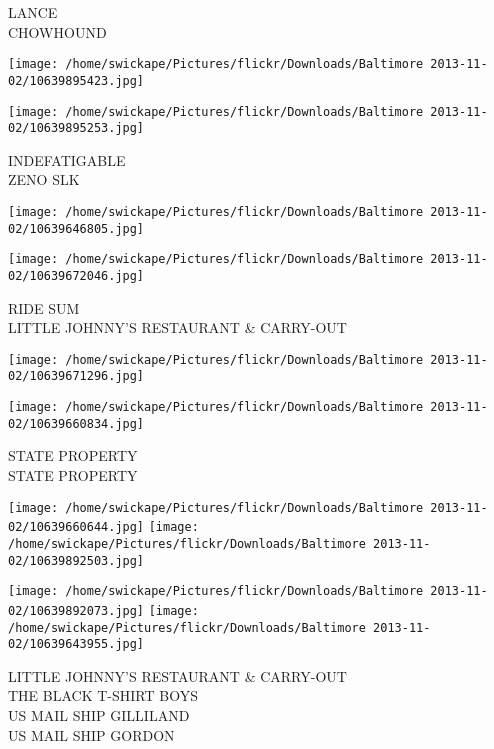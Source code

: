 \documentclass[10pt,letterpaper]{article}
\begin{document}
LANCE\\
CHOWHOUND\\
\pagebreak

\texttt{[image: /home/swickape/Pictures/flickr/Downloads/Baltimore 2013-11-02/10639895423.jpg]}

\vspace{0.25in}
\texttt{[image: /home/swickape/Pictures/flickr/Downloads/Baltimore 2013-11-02/10639895253.jpg]}

INDEFATIGABLE\\
ZENO SLK\\
\pagebreak

\texttt{[image: /home/swickape/Pictures/flickr/Downloads/Baltimore 2013-11-02/10639646805.jpg]}

\vspace{0.25in}
\texttt{[image: /home/swickape/Pictures/flickr/Downloads/Baltimore 2013-11-02/10639672046.jpg]}

RIDE SUM\\
LITTLE JOHNNY'S RESTAURANT \& CARRY{-}OUT\\
\pagebreak

\texttt{[image: /home/swickape/Pictures/flickr/Downloads/Baltimore 2013-11-02/10639671296.jpg]}

\vspace{0.25in}
\texttt{[image: /home/swickape/Pictures/flickr/Downloads/Baltimore 2013-11-02/10639660834.jpg]}

STATE PROPERTY\\
STATE PROPERTY\\
\pagebreak

\texttt{[image: /home/swickape/Pictures/flickr/Downloads/Baltimore 2013-11-02/10639660644.jpg]}
\texttt{[image: /home/swickape/Pictures/flickr/Downloads/Baltimore 2013-11-02/10639892503.jpg]}

\texttt{[image: /home/swickape/Pictures/flickr/Downloads/Baltimore 2013-11-02/10639892073.jpg]}
\texttt{[image: /home/swickape/Pictures/flickr/Downloads/Baltimore 2013-11-02/10639643955.jpg]}

LITTLE JOHNNY'S RESTAURANT \& CARRY{-}OUT\\
THE BLACK T{-}SHIRT BOYS\\
US MAIL SHIP GILLILAND\\
US MAIL SHIP GORDON\\
\pagebreak
\end{document}
